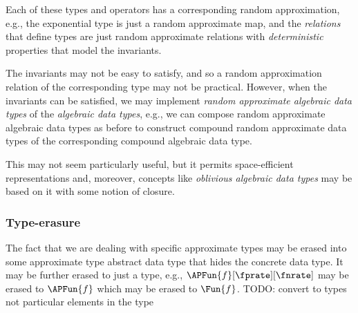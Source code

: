 \documentclass[ ../main.tex]{subfiles}
\begin{document}
	Each of these types and operators has a corresponding random approximation, e.g., the exponential type is just a random approximate map, and the \emph{relations} that define types are just random approximate relations with \emph{deterministic} properties that model the invariants.
	
	The invariants may not be easy to satisfy, and so a random approximation relation of the corresponding type may not be practical.
	However, when the invariants can be satisfied, we may implement \emph{random approximate algebraic data types} of the \emph{algebraic data types}, e.g., we can compose random approximate algebraic data types as before to construct compound random approximate data types of the corresponding compound algebraic data type.
	
	This may not seem particularly useful, but it permits space-efficient representations and, moreover, concepts like \emph{oblivious algebraic data types} may be based on it with some notion of closure.
	
\subsubsection{Type-erasure}
The fact that we are dealing with specific approximate types may be erased into some approximate type abstract data type that hides the concrete data type.
It may be further erased to just a type, e.g., $\APFun{f}[\fprate][\fnrate]$ may be erased to $\APFun{f}$ which may be erased to $\Fun{f}$.
TODO: convert to types not particular elements in the type
	
\end{document}
